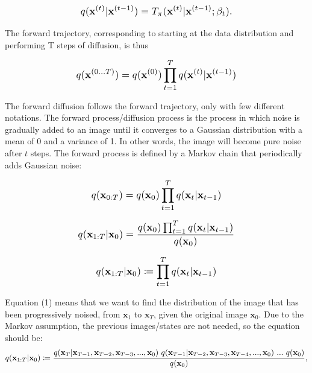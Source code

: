 \documentclass{article}
\newcommand*{\Scale}[2][4]{\scalebox{#1}{\ensuremath{#2}}}
\begin{document}
\begin{equation}
    \Scale[1.2]{ \displaystyle
        q(\textbf{x}^{(t)}|\textbf{x}^{(t-1)}) = T_{\pi}(\textbf{x}^{(t)}|\textbf{x}^{(t-1)};\beta_{t}).
    }
\end{equation}

The forward trajectory, corresponding to starting at the data distribution and performing T steps of diffusion, is thus

\begin{equation}
    \Scale[1.2]{ \displaystyle
        q(\textbf{x}^{(0...T)}) = q(\textbf{x}^{(0)}) \prod_{t=1}^{T} q(\textbf{x}^{(t)}|\textbf{x}^{(t-1)})
    }
\end{equation}

The forward diffusion follows the forward trajectory, only with few different notations. The forward process/diffusion process is the process in which noise is gradually added to an image until it converges to a Gaussian distribution with a mean of 0 and a variance of 1. In other words, the image will become pure noise after $ t $ steps. The forward process is defined by a Markov chain that periodically adds Gaussian noise:

\begin{equation}
    \Scale[1.2]{ \displaystyle
        q(\textbf{x}_{0:T}) = q(\textbf{x}_{0}) \prod_{t=1}^{T} q(\textbf{x}_{t}|\textbf{x}_{t-1})
    }
\end{equation}

\begin{equation}
    \Scale[1.2]{ \displaystyle
        q(\textbf{x}_{1:T}|\textbf{x}_{0}) = \frac{q(\textbf{x}_{0}) \prod_{t=1}^{T} q(\textbf{x}_{t}|\textbf{x}_{t-1})}{q(\textbf{x}_{0})}
    }
\end{equation}

\begin{equation}
\Scale[1.2]{ \displaystyle
q(\textbf{x}_{1:T}|\textbf{x}_{0}) \coloneq \displaystyle \prod_{t=1}^{T} q(\textbf{x}_{t}|\textbf{x}_{t-1}) }
\end{equation}

Equation (1) means that we want to find the distribution of the image that has been progressively noised, from $ \textbf{x}_{1} $ to $ \textbf{x}_{T} $, given the original image $ \textbf{x}_{0} $. Due to the Markov assumption, the previous images/states are not needed, so the equation should be:
\begin{equation}
\Scale[1.2]{ \displaystyle
q(\textbf{x}_{1:T}|\textbf{x}_{0}) \coloneq \frac{q(\textbf{x}_{T}|\textbf{x}_{T-1},\textbf{x}_{T-2},\textbf{x}_{T-3},...,\textbf{x}_{0}) \ q(\textbf{x}_{T-1}|\textbf{x}_{T-2},\textbf{x}_{T-3},\textbf{x}_{T-4},...,\textbf{x}_{0}) \ ... \ q(\textbf{x}_{0})  } {  q(\textbf{x}_{0}) }, }
\end{equation}
\end{document}
